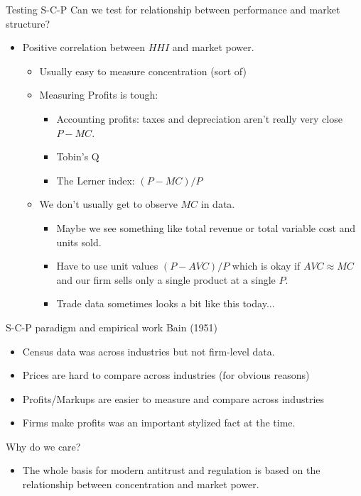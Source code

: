 \documentclass[xcolor=pdftex,dvipsnames,table,mathserif]{beamer}
\begin{document}
\begin{frame}{Testing S-C-P }
Can we test for relationship between performance and market structure?
\begin{itemize}
\item Positive correlation between $HHI$ and market power.
\begin{itemize}
\item Usually easy to measure concentration (sort of)
\item Measuring Profits is tough:
\begin{itemize}
\item Accounting profits: taxes and depreciation aren't really very close $P-MC$.
\item Tobin's Q
\item The Lerner index: $(P-MC)/P$
\end{itemize}
\item We don't usually get to observe $MC$ in data.

\begin{itemize}
\item Maybe we see something like total revenue or total variable cost and units sold.
\item Have to use unit values $(P-AVC)/P$ which is okay if $AVC \approx MC$ and our firm sells only a single product at a single $P$.
\item Trade data sometimes looks a bit like this today...
\end{itemize}
\end{itemize}
\end{itemize}
\end{frame}


\begin{frame}{S-C-P paradigm and empirical work}
Bain (1951)
\begin{itemize}
\item Census data was across industries but not firm-level data.
\item Prices are hard to compare across industries (for obvious reasons)
\item Profits/Markups are easier to measure and compare across industries
\item Firms make profits was an important stylized fact at the time.
\end{itemize}
Why do we care?
\begin{itemize}
\item The whole basis for modern antitrust and regulation is based on the relationship between concentration and market power.
\end{itemize}
\end{frame}
\end{document}
